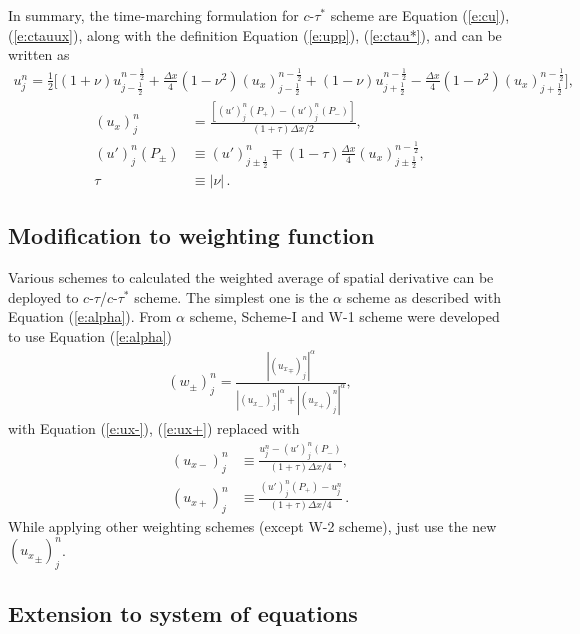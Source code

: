 \documentclass[11pt,dvips]{article}
\numberwithin{equation}{section}
\begin{document}
In summary, the time-marching formulation for $c$-$\tau^*$ scheme are Equation
(\ref{e:cu}), (\ref{e:ctauux}), along with the definition Equation
(\ref{e:upp}), (\ref{e:ctau*}), and can be written as
\begin{align*}
  u_j^n = \frac{1}{2}\Big[
      (1+\nu)u_{j-\frac{1}{2}}^{n-\frac{1}{2}}
    + \frac{\Delta x}{4}(1-\nu^2)(u_x)_{j-\frac{1}{2}}^{n-\frac{1}{2}}
    + (1-\nu)u_{j+\frac{1}{2}}^{n-\frac{1}{2}}
    - \frac{\Delta x}{4}(1-\nu^2)(u_x)_{j+\frac{1}{2}}^{n-\frac{1}{2}}
  \Big],
\end{align*}
\begin{align*}
  (u_x)_j^n &=
    \frac{\left[(u')_j^n(P_+) - (u')_j^n(P_-)\right]}
         {(1+\tau)\Delta x/2}, \\
  (u')_j^n(P_{\pm}) &\equiv
        (u')_{j\pm\frac{1}{2}}^n
    \mp (1-\tau)\frac{\Delta x}{4}
        (u_x)_{j\pm\frac{1}{2}}^{n-\frac{1}{2}}, \\
  \tau &\equiv |\nu|\,.
\end{align*}

\subsection{Modification to weighting function}

Various schemes to calculated the weighted average of spatial derivative can be
deployed to $c$-$\tau$/$c$-$\tau^*$ scheme.  The simplest one is the $\alpha$
scheme as described with Equation (\ref{e:alpha}).  From $\alpha$ scheme,
Scheme-I\cite{chang_courant_2002} and W-1
scheme\cite{chang_multi-dimensional_2003} were developed to use Equation
(\ref{e:alpha})
\begin{align*}
  (w_{\pm})_j^n =
    \frac{|({u_x}_{\mp})_j^n|^{\alpha}}
         {|({u_x}_-)_j^n|^{\alpha}+|({u_x}_+)_j^n|^{\alpha}},
\end{align*}
with Equation (\ref{e:ux-}), (\ref{e:ux+}) replaced with
\begin{align}
  (u_{x-})_j^n &\equiv
    \frac{u_j^n - (u')_j^n(P_-)}{(1+\tau)\Delta x/4}, \label{e:uxp-} \\
  (u_{x+})_j^n &\equiv
    \frac{(u')_j^n(P_+) - u_j^n}{(1+\tau)\Delta x/4}\,. \label{e:uxp+}
\end{align}
While applying other weighting schemes (except W-2 scheme), just use the new
$({u_{x}}_{\pm})_j^n$.

\subsection{Extension to system of equations}
\end{document}
